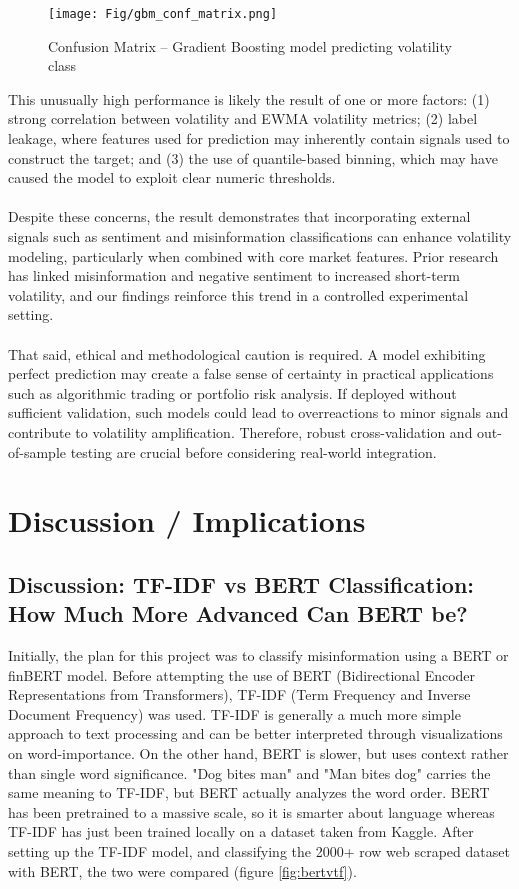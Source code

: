 \documentclass{article}
\begin{document}
\begin{figure}[H]
    \centering
    \texttt{[image: Fig/gbm\_conf\_matrix.png]}
    \caption{Confusion Matrix – Gradient Boosting model predicting volatility class}
    \label{fig:gbm_conf_matrix}
\end{figure}

This unusually high performance is likely the result of one or more factors: (1) strong correlation between volatility and EWMA volatility metrics; (2) label leakage, where features used for prediction may inherently contain signals used to construct the target; and (3) the use of quantile-based binning, which may have caused the model to exploit clear numeric thresholds.
\\\\
Despite these concerns, the result demonstrates that incorporating external signals such as sentiment and misinformation classifications can enhance volatility modeling, particularly when combined with core market features. Prior research has linked misinformation and negative sentiment to increased short-term volatility, and our findings reinforce this trend in a controlled experimental setting.
\\\\
That said, ethical and methodological caution is required. A model exhibiting perfect prediction may create a false sense of certainty in practical applications such as algorithmic trading or portfolio risk analysis. If deployed without sufficient validation, such models could lead to overreactions to minor signals and contribute to volatility amplification. Therefore, robust cross-validation and out-of-sample testing are crucial before considering real-world integration.


\section{Discussion / Implications}
\subsection{Discussion: TF-IDF vs BERT Classification: How Much More Advanced Can BERT be?}
Initially, the plan for this project was to classify misinformation using a BERT or finBERT model. Before attempting the use of BERT (Bidirectional Encoder Representations from Transformers), TF-IDF (Term Frequency and Inverse Document Frequency) was used. TF-IDF is generally a much more simple approach to text processing and can be better interpreted through visualizations on word-importance. On the other hand, BERT is slower, but uses context rather than single word significance. "Dog bites man" and "Man bites dog" carries the same meaning to TF-IDF, but BERT actually analyzes the word order. BERT has been pretrained to a massive scale, so it is smarter about language whereas TF-IDF has just been trained locally on a dataset taken from Kaggle. After setting up the TF-IDF model, and classifying the 2000+ row web scraped dataset with BERT, the two were compared (figure \ref{fig:bertvtf}).
\end{document}

